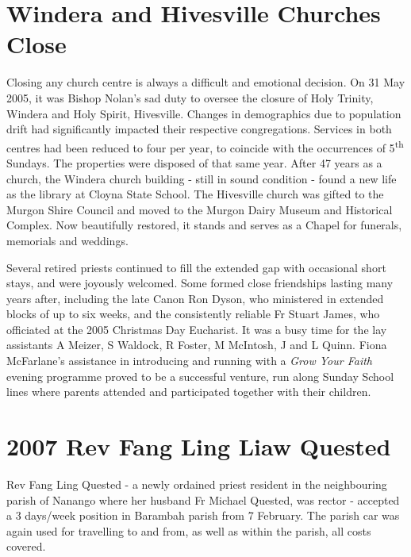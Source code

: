 \hypertarget{windera-and-hivesville-churches-close}{%
\section{Windera and Hivesville Churches Close}\label{windera-and-hivesville-churches-close}}

Closing any church centre is always a difficult and emotional decision. On 31 May 2005, it was Bishop Nolan's sad duty to oversee the closure of Holy Trinity, Windera and Holy Spirit, Hivesville. Changes in demographics due to population drift had significantly impacted their respective congregations. Services in both centres had been reduced to four per year, to coincide with the occurrences of 5\textsuperscript{th} Sundays. The properties were disposed of that same year. After 47 years as a church, the Windera church building - still in sound condition - found a new life as the library at Cloyna State School. The Hivesville church was gifted to the Murgon Shire Council and moved to the Murgon Dairy Museum and Historical Complex. Now beautifully restored, it stands and serves as a Chapel for funerals, memorials and weddings.

Several retired priests continued to fill the extended gap with occasional short stays, and were joyously welcomed. Some formed close friendships lasting many years after, including the late Canon Ron Dyson, who ministered in extended blocks of up to six weeks, and the consistently reliable Fr Stuart James, who officiated at the 2005 Christmas Day Eucharist. It was a busy time for the lay assistants A Meizer, S Waldock, R Foster, M McIntosh, J and L Quinn. Fiona McFarlane's assistance in introducing and running with a \emph{Grow Your Faith} evening programme proved to be a successful venture, run along Sunday School lines where parents attended and participated together with their children.

\hypertarget{rev-fang-ling-liaw-quested}{%
\section{2007 Rev Fang Ling Liaw Quested}\label{rev-fang-ling-liaw-quested}}

Rev Fang Ling Quested - a newly ordained priest resident in the neighbouring parish of Nanango where her husband Fr Michael Quested, was rector - accepted a 3 days/week position in Barambah parish from 7 February. The parish car was again used for travelling to and from, as well as within the parish, all costs covered.

